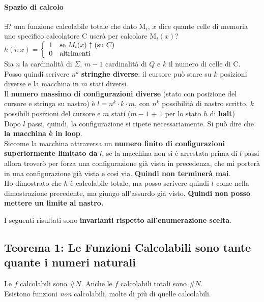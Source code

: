 \documentclass[10pt]{book}
\begin{document}
\paragraph{Spazio di calcolo} $\exists$? una funzione calcolabile totale che dato M$_i$, $x$ dice quante celle di memoria uno specifico calcolatore C userà per calcolare M$_i(x)$?\\
$h(i, x) = $\begin{math}
\left\{
\begin{array}{l l}
	1 & \text{se }M_i(x)\uparrow (\text{su }C)\\
	0 & \text{altrimenti}
\end{array}
\right.
\end{math}\\
Sia $n$ la cardinalità di $\Sigma$, $m - 1$ cardinalità di $Q$ e $k$ il numero di celle di C.\\
Posso quindi scrivere $n^k$ \textbf{stringhe diverse}: il cursore può stare su $k$ posizioni diverse e la macchina in $m$ stati diversi.\\
Il \textbf{numero massimo di configurazioni diverse} (stato con posizione del cursore e stringa su nastro) è  $l = n^k \cdot k \cdot m$, con $n^k$ possibilità di nastro scritto, $k$ possibili posizioni del cursore e $m$ stati ($m - 1$ + $1$ per lo stato $h$ di \textbf{halt})\\
Dopo $l$ passi, quindi, la configurazione si ripete necessariamente. Si può dire che \textbf{la macchina è in loop}.\\
Siccome la macchina attraversa un \textbf{numero finito di configurazioni superiormente limitato da} $l$, se la macchina non si è arrestata prima di $l$ passi allora troverò per forza una configurazione già vista in precedenza, che mi porterà in una configurazione già vista e così via. \textbf{Quindi non terminerà mai}.\\
Ho dimostrato che $h$ è calcolabile totale, ma posso scrivere quindi $t$ come nella dimostrazione precedente, ma giungo all'assurdo già visto. \textbf{Quindi non posso mettere un limite al nastro.}
\pagebreak

I seguenti risultati sono \textbf{invarianti rispetto all'enumerazione scelta}.
\subsection{Teorema 1: Le Funzioni Calcolabili sono tante quante i numeri naturali}
Le $f$ calcolabili sono \#$N$. Anche le $f$ calcolabili totali sono \#$N$.\\
Esistono funzioni \textit{non} calcolabili, molte di più di quelle calcolabili.
\end{document}
